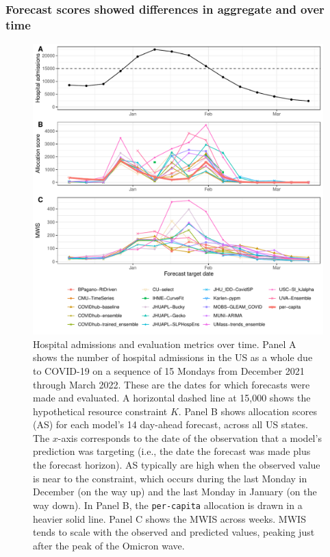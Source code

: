 \documentclass{article}\usepackage[]{graphicx}\usepackage[]{xcolor}
\makeatletter
\def\maxwidth{ %
  \ifdim\Gin@nat@width>\linewidth
    \linewidth
  \else
    \Gin@nat@width
  \fi
}
\newenvironment{knitrout}{}{} %
\makeatother
\begin{document}
\subsubsection{Forecast scores showed differences in aggregate and over time}



\begin{knitrout}
\color{fgcolor}\begin{figure}
\includegraphics[width=\maxwidth]{figure/metrics-over-time-1} \caption[Hospital admissions and evaluation metrics over time]{Hospital admissions and evaluation metrics over time. Panel A shows the number of hospital admissions in the US as a whole due to COVID-19 on a sequence of 15 Mondays from December 2021 through March 2022. These are the dates for which forecasts were made and evaluated. A horizontal dashed line at 15,000 shows the hypothetical resource constraint $K$. Panel B shows allocation scores (AS) for each model's 14 day-ahead forecast, across all US states. The $x$-axis corresponds to the date of the observation that a model's prediction was targeting (i.e., the date the forecast was made plus the forecast horizon). AS typically are high when the observed value is near to the constraint, which occurs during the last Monday in December (on the way up) and the last Monday in January (on the way down). In Panel B, the \texttt{per-capita} allocation is drawn in a heavier solid line. Panel C shows the MWIS  across weeks. MWIS tends to scale with the observed and predicted values, peaking just after the peak of the Omicron wave.}\label{fig:metrics-over-time}
\end{figure}

\end{knitrout}
\end{document}
